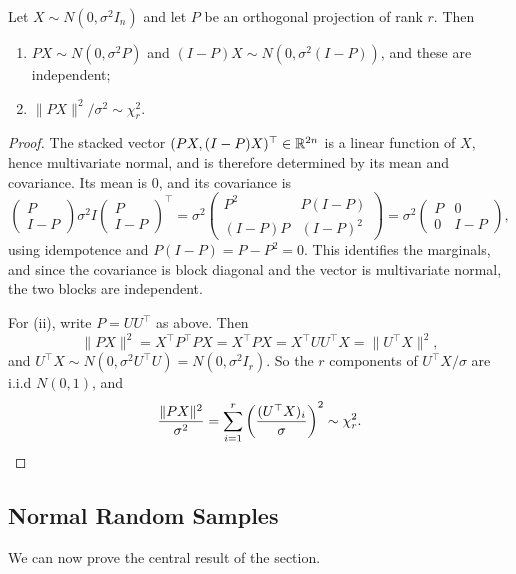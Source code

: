 \documentclass[a4paper]{scrartcl}
\begin{document}
\begin{theorem}\label{thm:proj}
  Let $X \sim N(0,\sigma^2 I_n)$ and let $P$ be an orthogonal projection of rank $r$. Then
  \begin{enumerate}[label=(\roman*)]
    \item $PX \sim N(0,\sigma^2P)$ and $(I-P)X \sim N(0,\sigma^2(I-P))$, and these are independent;
    \item $\|PX\|^2/\sigma^2 \sim \chi^2_r$.
  \end{enumerate}
\end{theorem}
\begin{proof}
  The stacked vector $(PX, (I-P)X)^\top \in \mathbb{R}^{2n}$ is a linear function of $X$, hence multivariate normal, and is therefore determined by its mean and covariance. Its mean is $0$, and its covariance is
  $$
  \begin{pmatrix}P\\I-P\end{pmatrix}\sigma^2 I \begin{pmatrix}P\\I-P\end{pmatrix}^\top
  = \sigma^2\begin{pmatrix}P^2 & P(I-P)\\(I-P)P & (I-P)^2\end{pmatrix} = \sigma^2\begin{pmatrix}P&0\\0&I-P\end{pmatrix},
  $$
  using idempotence and $P(I-P) = P - P^2 = 0$. This identifies the marginals, and since the covariance is block diagonal and the vector is multivariate normal, the two blocks are independent.

  For (ii), write $P = UU^\top$ as above. Then
  $$
  \|PX\|^2 = X^\top P^\top P X = X^\top P X = X^\top U U^\top X = \|U^\top X\|^2,
  $$
  and $U^\top X \sim N(0, \sigma^2 U^\top U) = N(0,\sigma^2 I_r)$. So the $r$ components of $U^\top X/\sigma$ are i.i.d $N(0,1)$, and
  $$
  \frac{\|PX\|^2}{\sigma^2} = \sum_{i=1}^{r}\left(\frac{(U^\top X)_i}{\sigma}\right)^2 \sim \chi^2_r. \qedhere
  $$
\end{proof}

\subsection{Normal Random Samples}

We can now prove the central result of the section.
\end{document}
